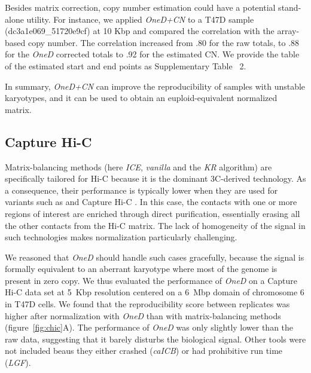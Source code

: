 \documentclass[a4,center,fleqn]{NAR}
\begin{document}
Besides matrix correction, copy number estimation could have a potential stand-alone
utility. For instance, we applied \textit{OneD+CN} to a T47D sample
(dc3a1e069\_51720e9cf) at 10 Kbp and compared the correlation with the
array-based copy number. The correlation increased from .80 for the raw totals,
to .88 for the \textit{OneD} corrected totals to .92 for the estimated CN. We
provide the table of the estimated start and end points as Supplementary Table~
2.

In summary, \textit{OneD+CN} can improve the reproducibility of samples
with unstable karyotypes, and it can be used to obtain an
euploid-equivalent normalized matrix.


\subsection{Capture Hi-C}

Matrix-balancing methods (here \textit{ICE}, \textit{vanilla} and the
\textit{KR} algorithm) are specifically tailored for Hi-C because it is
the dominant 3C-derived technology. As a consequence, their performance is
typically lower when they are used for variants such as and Capture Hi-C
\citep{jager2015capture}. In this case, the contacts with one or more
regions of interest are enriched through direct purification, essentially
erasing all the other contacts from the Hi-C matrix. The lack of
homogeneity of the signal in such technologies makes normalization
particularly challenging.

We reasoned that \textit{OneD} should handle such cases gracefully,
because the signal is formally equivalent to an aberrant karyotype where
most of the genome is present in zero copy. We thus evaluated the
performance of \textit{OneD} on a Capture Hi-C data set at 5~Kbp
resolution centered on a 6~Mbp domain of chromosome 6 in T47D cells. We
found that the reproducibility score between replicates was higher after
normalization with \textit{OneD} than with matrix-balancing methods
(figure~\ref{fig:chic}A). The performance of \textit{OneD} was only
slightly lower than the raw data, suggesting that it barely disturbs the
biological signal. Other tools were not included beaus they either
crashed (\textit{caICB}) or had prohibitive run time (\textit{LGF}).
\end{document}
